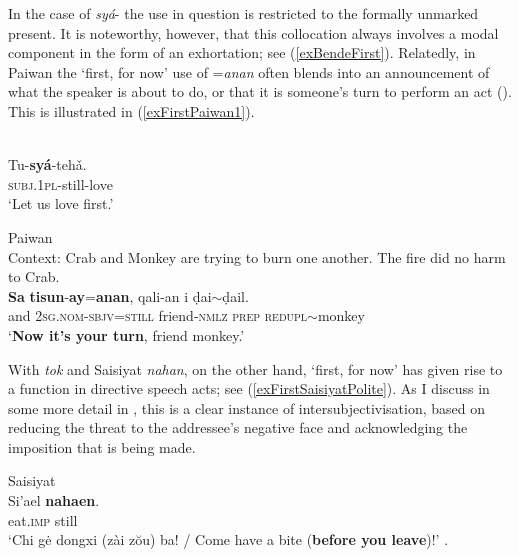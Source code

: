 In the case of  \mbox{\textit{syá}-} the use in question is restricted to the formally unmarked  present. It is noteworthy, however, that this collocation always involves a modal component in the form of an exhortation; see (\ref{exBendeFirst}). Relatedly, in Paiwan the \lq first, for now\rq{ }use of \mbox{=\textit{anan}} often blends into an announcement of what the speaker is about to do, or that it is someone's turn to perform an act (). This is illustrated in (\ref{exFirstPaiwan1}).

\begin{exe}
	\ex {}\label{exBendeFirst}\\
	\gll Tu-\textbf{syá}-tehǎ.\\
	\textsc{subj}.1\textsc{pl}-still-love\\
	\glt \lq Let us love first.\rq{ }\parencite{Abe2016}	

	\ex Paiwan \label{exFirstPaiwan1}\\
	 Context: Crab and Monkey are trying to burn one another. The fire did no harm to Crab.\\
	\gll \textbf{Sa} \textbf{tisun}-\textbf{ay}=\textbf{anan}, qali-an i ḍai$\sim$ḍail.\\
	and 2\textsc{sg}.\textsc{nom}-\textsc{sbjv}=\textsc{still} friend-\textsc{nmlz} \textsc{prep} \textsc{redupl}$\sim$monkey\\
	\glt [Crab:] \lq \textbf{Now it’s your turn}, friend monkey.'
	\\\parencite[197]{EarlyWhitehorn2003}
\end{exe}

With  \textit{tok} and Saisiyat \textit{nahan}, on the other hand, \lq first, for now\rq{ }has given rise to a  function in directive speech acts; see (\ref{exFirstSaisiyatPolite}). As I discuss in some more detail in , this is a clear instance of intersubjectivisation, based on reducing the threat to the addressee's negative face and acknowledging the imposition that is being made.

\begin{exe}
	\ex Saisiyat\label{exFirstSaisiyatPolite}\\
	\gll Si\rq{}ael \textbf{nahaen}.\\
	eat.\textsc{imp} still\\
	\glt \lq Chi gė dongxi (zài zŏu) ba! / Come have a bite (\textbf{before you leave})!\rq{ }\parencite[120]{Huang2008}.
\end{exe}


